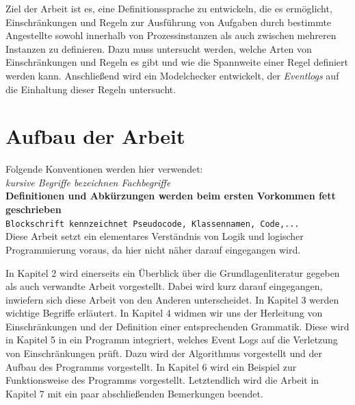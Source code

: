 Ziel der Arbeit ist es, eine Definitionssprache zu entwickeln, die es ermöglicht, Einschränkungen und Regeln zur Ausführung von Aufgaben durch bestimmte Angestellte sowohl innerhalb von Prozessinstanzen als auch zwischen mehreren Instanzen zu definieren. Dazu muss untersucht werden, welche Arten von Einschränkungen und Regeln es gibt und wie die Spannweite einer Regel definiert werden kann. Anschließend wird ein Modelchecker entwickelt, der \textit{Eventlogs} auf die Einhaltung dieser Regeln untersucht.




\section{Aufbau der Arbeit}
Folgende Konventionen werden hier verwendet:\\
\textit{kursive Begriffe  bezeichnen Fachbegriffe}\\
\textbf{Definitionen und Abkürzungen werden beim ersten Vorkommen fett geschrieben}\\
\texttt{Blockschrift kennzeichnet Pseudocode, Klassennamen, Code,...}\\

Diese Arbeit setzt ein elementares Verständnis von Logik und logischer Programmierung voraus, da hier nicht näher darauf eingegangen wird.

In Kapitel 2 wird einerseits ein Überblick über die Grundlagenliteratur gegeben als auch verwandte Arbeit vorgestellt. Dabei wird kurz darauf eingegangen, inwiefern sich diese Arbeit von den Anderen unterscheidet. In Kapitel 3 werden wichtige Begriffe erläutert. In Kapitel 4 widmen wir uns der  Herleitung von Einschränkungen und der Definition einer entsprechenden Grammatik. Diese wird in Kapitel 5 in ein Programm integriert, welches Event Logs auf die Verletzung von Einschränkungen prüft. Dazu wird der Algorithmus vorgestellt und der Aufbau des Programms vorgestellt. In Kapitel 6 wird ein Beispiel zur Funktionsweise des Programms vorgestellt. Letztendlich wird die Arbeit in Kapitel 7 mit ein paar abschließenden Bemerkungen beendet.


